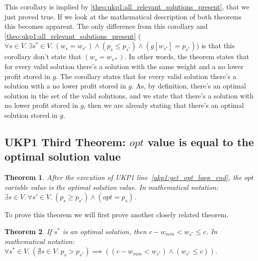 \documentclass[12pt]{article}
\newtheorem{theorem}{Theorem}
\begin{document}
This corollary is implied by \autoref{theo:ukp1:all_relevant_solutions_present}, that we just proved true. If we look at the mathematical description of both theorems this becomes apparent. The only difference from this corollary and \autoref{theo:ukp1:all_relevant_solutions_present} (\(\forall s \in V.~\exists s^* \in V.~(w_s = w_{s^*}) \land (p_s \leq p_{s^*}) \land (g[w_{s^*}] = p_{s^*})\)) is that this corollary don't state that \((w_s = w_{s*})\). In other words, the theorem states that for every valid solution there's a solution with the same weight and a no lower profit stored in \(g\). The corollary states that for every valid solution there's a solution with a no lower profit stored in \(g\). As, by definition, there's an optimal solution in the set of the valid solutions, and we state that there's a solution with no lower profit stored in \(g\), then we are already stating that there's an optimal solution stored in \(g\).


\subsection{UKP1 Third Theorem: \(opt\) value is equal to the optimal solution value}

\begin{theorem}\label{theo:ukp1:opt_variable}
After the execution of UKP1 line~\ref{ukp1:get_opt_loop_end}, the \(opt\) variable value is the optimal solution value. In mathematical notation: \(\exists s \in V.~\forall s' \in V.~(p_s \geq p_{s'}) \land (opt = p_s)\).
\end{theorem}

To prove this theorem we will first prove another closely related theorem.

\begin{theorem}\label{theo:opt_sol_weight_range}
If \(s^*\) is an optimal solution, then \(c - w_{min} < w_{s^*} \leq c\). In mathematical notation: \(\forall s^* \in V.~(\nexists s \in V.~p_s > p_{s^*}) \implies ((c - w_{min} < w_{s^*}) \land (w_{s^*} \leq c))\).
\end{theorem}
\end{document}
